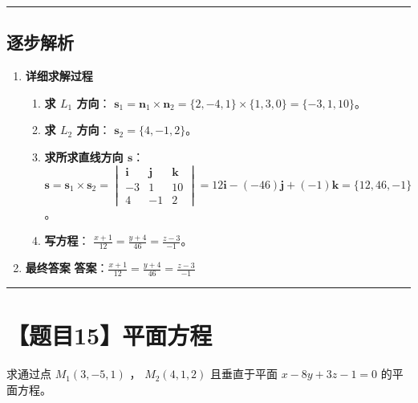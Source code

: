 \documentclass[UTF8]{ctexart}
\newenvironment{redenv}{\color{red}}{}
\newenvironment{detailedanalysis}{%
    \color{red}
    \begin{enumerate}[label=\textbf{第\arabic*步：}, leftmargin=*, align=left, itemsep=1.5ex]
}{%
    \end{enumerate}
}
\newcommand{\problemrule}{\noindent\rule{\textwidth}{1.5pt}\vspace{-0.8em}}
\newcommand{\analysisrule}{\noindent\rule{\textwidth}{0.8pt}\vspace{-0.8em}}
\begin{document}
\begin{redenv}
\analysisrule
\subsection*{逐步解析}

\begin{detailedanalysis}
\item \textbf{详细求解过程}
\begin{enumerate}[label=(\arabic*)]
\item \textbf{求 $L_1$ 方向}：
$\mathbf{s}_1 = \mathbf{n}_1 \times \mathbf{n}_2 = \{2, -4, 1\} \times \{1, 3, 0\} = \{-3, 1, 10\}$。
\item \textbf{求 $L_2$ 方向}：
$\mathbf{s}_2 = \{4, -1, 2\}$。
\item \textbf{求所求直线方向 $\mathbf{s}$}：
$\mathbf{s} = \mathbf{s}_1 \times \mathbf{s}_2 = \begin{vmatrix} \mathbf{i} & \mathbf{j} & \mathbf{k} \\ -3 & 1 & 10 \\ 4 & -1 & 2 \end{vmatrix} = 12\mathbf{i} - (-46)\mathbf{j} + (-1)\mathbf{k} = \{12, 46, -1\}$。
\item \textbf{写方程}：
$\frac{x+1}{12} = \frac{y+4}{46} = \frac{z-3}{-1}$。
\end{enumerate}

\item \textbf{最终答案}
\textbf{答案}：$ \frac{x+1}{12} = \frac{y+4}{46} = \frac{z-3}{-1} $
\end{detailedanalysis}
\end{redenv}

\problemrule
\section*{【题目15】平面方程}
求通过点 $ M_{1}(3,-5,1) $ ， $ M_{2}(4,1,2) $ 且垂直于平面 $ x-8y+3z-1=0 $ 的平面方程。
\end{document}
